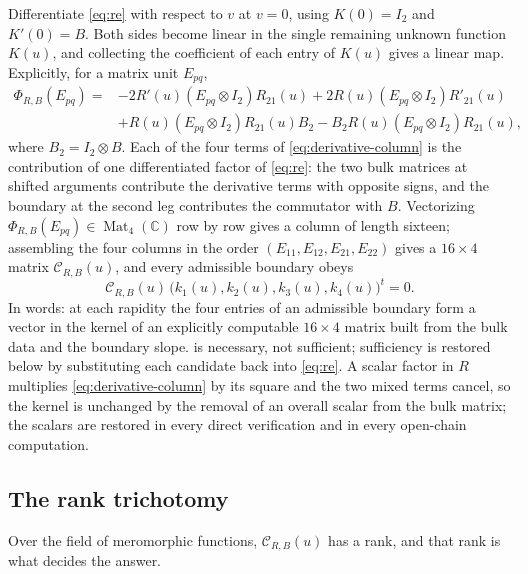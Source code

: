 \documentclass[11pt,reqno]{amsart}
\theoremstyle{plain}
\theoremstyle{definition}
\theoremstyle{remark}
\numberwithin{equation}{section}
\newcommand{\Mat}{\operatorname{Mat}}
\newcommand{\C}{\mathbb C}
\newcommand{\Id}{I_2}
\begin{document}
Differentiate \cref{eq:re} with respect to $v$ at $v=0$, using $K(0)=\Id$ and
$K'(0)=B$. Both sides become linear in the single remaining unknown function
$K(u)$, and collecting the coefficient of each entry of $K(u)$ gives a linear
map. Explicitly, for a matrix unit $E_{pq}$,
\begin{equation}
\begin{split}
\Phi_{R,B}(E_{pq})={}&
-2R'(u)(E_{pq}\otimes \Id)R_{21}(u)
+2R(u)(E_{pq}\otimes \Id)R'_{21}(u)\\
&+R(u)(E_{pq}\otimes \Id)R_{21}(u)B_2
-B_2R(u)(E_{pq}\otimes \Id)R_{21}(u),
                                                               \label{eq:derivative-column}
\end{split}
\end{equation}
where $B_2=\Id\otimes B$. Each of the four terms of \cref{eq:derivative-column}
is the contribution of one differentiated factor of \cref{eq:re}: the two bulk
matrices at shifted arguments contribute the derivative terms with opposite
signs, and the boundary at the second leg contributes the commutator with $B$.
Vectorizing $\Phi_{R,B}(E_{pq})\in\Mat_4(\C)$ row by row gives a column of
length sixteen; assembling the four columns in the order
$(E_{11},E_{12},E_{21},E_{22})$ gives a $16\times4$ matrix
$\mathcal C_{R,B}(u)$, and every admissible boundary obeys
\begin{equation}
\mathcal C_{R,B}(u)\,\bigl(k_1(u),k_2(u),k_3(u),k_4(u)\bigr)^{t}=0.
             \label{eq:derivative-system}
\end{equation}
In words: at each rapidity the four entries of an admissible boundary form a
vector in the kernel of an explicitly computable $16\times4$ matrix built from
the bulk data and the boundary slope.  is necessary,
not sufficient; sufficiency is restored below by substituting each candidate back
into \cref{eq:re}. A scalar factor in $R$ multiplies
\cref{eq:derivative-column} by its square and the two mixed terms cancel, so the
kernel is unchanged by the removal of an overall scalar from the bulk matrix; the
scalars are restored in every direct verification and in every open-chain
computation.

\subsection{The rank trichotomy}

Over the field of meromorphic functions, $\mathcal C_{R,B}(u)$ has a rank, and
that rank is what decides the answer.
\end{document}
